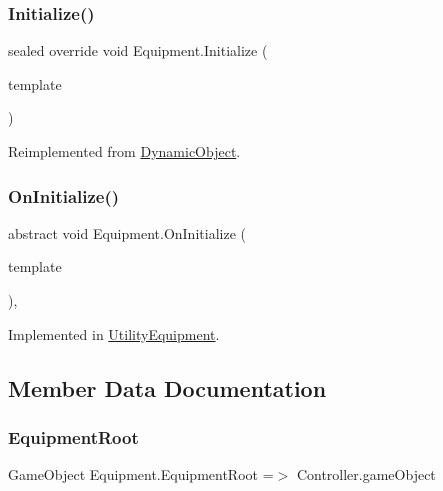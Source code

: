 \subsubsection{\texorpdfstring{Initialize()}{Initialize()}}
{\footnotesize\ttfamily sealed override void Equipment.\+Initialize (\begin{DoxyParamCaption}\item[{\mbox{\hyperlink{class_dynamic_object_template}{Dynamic\+Object\+Template}}}]{template }\end{DoxyParamCaption})\hspace{0.3cm}{\ttfamily [virtual]}}



Reimplemented from \mbox{\hyperlink{class_dynamic_object_a51dc678c061bc3a5eb60c3d96a1ef506}{Dynamic\+Object}}.

\mbox{\label{class_equipment_ae9932146aba24d5a614d1eb8ab415e10}} 
\subsubsection{\texorpdfstring{On\+Initialize()}{OnInitialize()}}
{\footnotesize\ttfamily abstract void Equipment.\+On\+Initialize (\begin{DoxyParamCaption}\item[{\mbox{\hyperlink{class_equipment_template}{Equipment\+Template}}}]{template }\end{DoxyParamCaption})\hspace{0.3cm}{\ttfamily [protected]}, {}}



Implemented in \mbox{\hyperlink{class_utility_equipment_a1b8bbcd0b373613156c289e68fcc3a99}{Utility\+Equipment}}.



\subsection{Member Data Documentation}
\mbox{\label{class_equipment_ae1c5b53dfef7c8e2a86c40d72bc5db62}} 
\subsubsection{\texorpdfstring{Equipment\+Root}{EquipmentRoot}}
{\footnotesize\ttfamily Game\+Object Equipment.\+Equipment\+Root =$>$ Controller.\+game\+Object}

